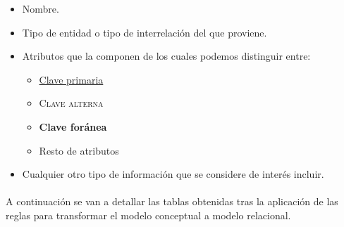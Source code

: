    \begin{itemize}
    \item Nombre.
    \item Tipo de entidad o tipo de interrelación del que proviene.
    \item Atributos que la componen de los cuales podemos distinguir entre:
    \begin{itemize}
     \item \underline{Clave primaria}
     \item \textsc{Clave alterna}
     \item \textbf{Clave foránea}
     \item Resto de atributos
    \end{itemize}
    \item Cualquier otro tipo de información que se considere de interés
          incluir.
   \end{itemize}

  \paragraph{}A continuación se van a detallar las tablas obtenidas tras la
  aplicación de las reglas para transformar el modelo conceptual a modelo
  relacional.

